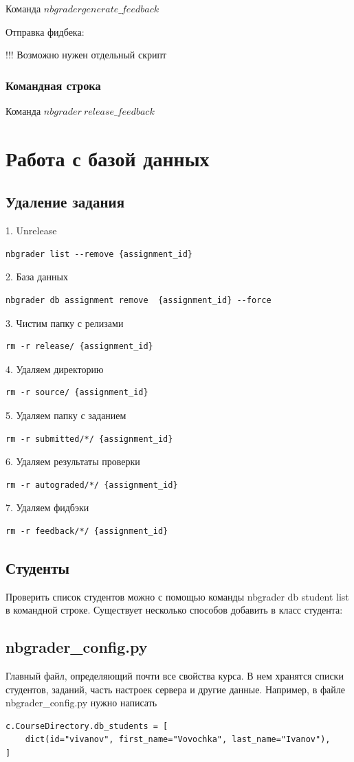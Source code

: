 \documentclass[a4paper,12pt]{article}
\begin{document}
Команда $nbgrader generate\_feedback$

Отправка фидбека:


!!! Возможно нужен отдельный скрипт

\subsubsection{Командная строка}

Команда $nbgrader\ release\_feedback$

\section{Работа с базой данных}

\subsection{Удаление задания}
1. Unrelease 
\begin{verbatim}
nbgrader list --remove {assignment_id}
\end{verbatim}
2. База данных 
\begin{verbatim}
nbgrader db assignment remove  {assignment_id} --force 
\end{verbatim}
3. Чистим папку с релизами
\begin{verbatim}
rm -r release/ {assignment_id}
\end{verbatim}
4. Удаляем директорию 
\begin{verbatim}
rm -r source/ {assignment_id}
\end{verbatim}
5. Удаляем папку с заданием
\begin{verbatim}
rm -r submitted/*/ {assignment_id}
\end{verbatim}
6. Удаляем результаты проверки
\begin{verbatim}
rm -r autograded/*/ {assignment_id}
\end{verbatim}
7. Удаляем фидбэки
\begin{verbatim}
rm -r feedback/*/ {assignment_id}
\end{verbatim}
\subsection{Студенты}

Проверить список студентов можно с помощью команды  nbgrader db student list в командной строке.
Существует несколько способов добавить в класс студента:
\subsection{nbgrader\_config.py}
Главный файл, определяющий почти все свойства курса. В нем хранятся списки студентов, заданий, часть настроек сервера и другие данные.
Например, в файле nbgrader\_config.py нужно написать
\begin{verbatim}
c.CourseDirectory.db_students = [
    dict(id="vivanov", first_name="Vovochka", last_name="Ivanov"),
]
\end{verbatim}
\end{document}
